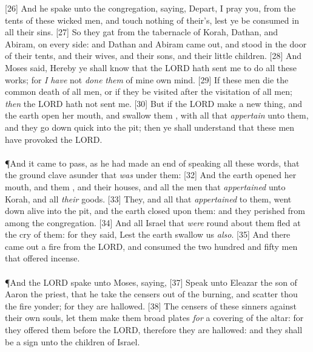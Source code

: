 [26] \textcolor[cmyk]{0.99998,1,0,0}{And he spake unto the congregation, saying, Depart, I pray you, from the tents of these wicked men, and touch nothing of their's, lest ye be consumed in all their sins.}
[27] \textcolor[cmyk]{0.99998,1,0,0}{So they gat  from the tabernacle of Korah, Dathan, and Abiram, on every side: and Dathan and Abiram came out, and stood in the door of their tents, and their wives, and their sons, and their little children.}
[28] \textcolor[cmyk]{0.99998,1,0,0}{And Moses said, Hereby ye shall know that the LORD hath sent me to do all these works; for \emph{I} \emph{have} not \emph{done} \emph{them} of mine own mind.}
[29] \textcolor[cmyk]{0.99998,1,0,0}{If these men die the common death of all men, or if they be visited after the visitation of all men; \emph{then} the LORD hath not sent me.}
[30] \textcolor[cmyk]{0.99998,1,0,0}{But if the LORD make a new thing, and the earth open her mouth, and swallow them , with all that \emph{appertain} unto them, and they go down quick into the pit; then ye shall understand that these men have provoked the LORD.}\\
\\
\P \textcolor[cmyk]{0.99998,1,0,0}{And it came to pass, as he had made an end of speaking all these words, that the ground clave asunder that \emph{was} under them:}
[32] \textcolor[cmyk]{0.99998,1,0,0}{And the earth opened her mouth, and  them , and their houses, and all the men that \emph{appertained} unto Korah, and all \emph{their} goods.}
[33] \textcolor[cmyk]{0.99998,1,0,0}{They, and all that \emph{appertained} to them, went down alive into the pit, and the earth closed upon them: and they perished from among the congregation.}
[34] \textcolor[cmyk]{0.99998,1,0,0}{And all Israel that \emph{were} round about them fled at the cry of them: for they said, Lest the earth swallow us  \emph{also}.}
[35] \textcolor[cmyk]{0.99998,1,0,0}{And there came out a fire from the LORD, and consumed the two hundred and fifty men that offered incense.}\\
\\
\P \textcolor[cmyk]{0.99998,1,0,0}{And the LORD spake unto Moses, saying,}
[37] \textcolor[cmyk]{0.99998,1,0,0}{Speak unto Eleazar the son of Aaron the priest, that he take  the censers out of the burning, and scatter thou the fire yonder; for they are hallowed.}
[38] \textcolor[cmyk]{0.99998,1,0,0}{The censers of these sinners against their own souls, let them make them broad plates \emph{for} a covering of the altar: for they offered them before the LORD, therefore they are hallowed: and they shall be a sign unto the children of Israel.}

